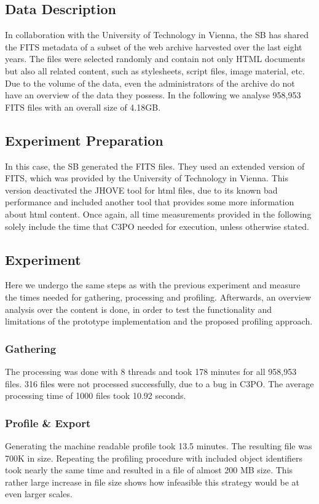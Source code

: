 \subsection{Data Description}
In collaboration with the University of Technology in Vienna, the SB has shared the FITS metadata of a subset of the web archive harvested over the last eight years.
The files were selected randomly and contain not only HTML documents but also all related content, such as stylesheets, script files, image material, etc.
Due to the volume of the data, even the administrators of the archive do not have an overview of the data they possess.
In the following we analyse 958,953 FITS files with an overall size of 4.18GB.

\subsection{Experiment Preparation}
In this case, the SB generated the FITS files. They used an extended version of FITS, which was provided by the University of Technology in Vienna.
This version deactivated the JHOVE tool for html files, due to its known bad performance and  included another tool that provides some more information about html content.
Once again, all time measurements provided in the following solely include the time that C3PO needed for execution, unless otherwise stated.

\subsection{Experiment}
Here we undergo the same steps as with the previous experiment and measure the times needed for gathering, processing and profiling.
Afterwards, an overview analysis over the content is done, in order to test the functionality and limitations of the prototype implementation and the proposed profiling approach.

\subsubsection{Gathering}
The processing was done with 8 threads and took 178 minutes for  all 958,953 files. 316 files were not processed successfully, due to a bug in C3PO. The average processing time of 1000 files took 10.92 seconds. 

\subsubsection{Profile \& Export}
Generating the machine readable profile took 13.5 minutes. The resulting file was 700K in size. Repeating the profiling procedure with included object identifiers took nearly the same time and resulted in a file of almost 200 MB size. This rather large increase in file size shows how infeasible this strategy would be at even larger scales.

